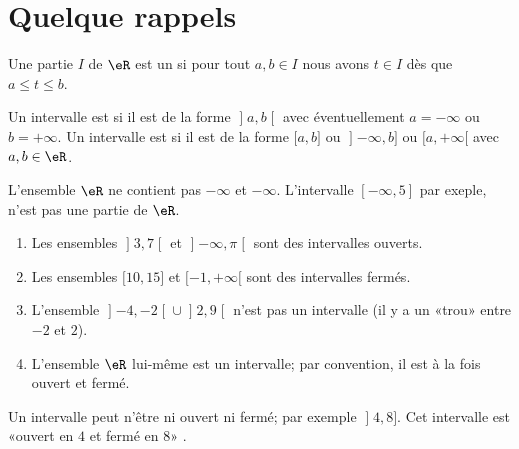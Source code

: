 
\section{Quelque rappels}

\begin{definition}[Intervalle]
    Une partie \( I\) de \( \eR\) est un  si pour tout \( a,b\in I\) nous avons \( t\in I\) dès que \( a\leq t\leq b\).

    Un intervalle est  si il est de la forme \( \mathopen] a , b \mathclose[\) avec éventuellement \( a=-\infty\) ou \( b=+\infty\). Un intervalle est  si il est de la forme \( \mathopen[ a , b \mathclose]\) ou \( \mathopen] -\infty , b \mathclose]\) ou \( \mathopen[ a , +\infty [\) avec \( a,b\in \eR\).
\end{definition}

\begin{remark}
  L'ensemble $\eR$ ne contient pas $-\infty$ et $-\infty$. L'intervalle $[-\infty, 5]$ par exeple, n'est pas une partie de $\eR$.
\end{remark}

\begin{example}
    \begin{enumerate}
        \item
        Les ensembles \( \mathopen] 3 , 7 \mathclose[\) et \( \mathopen] -\infty , \pi \mathclose[\) sont des intervalles ouverts.
        \item
            Les ensembles \( \mathopen[ 10 , 15 \mathclose]\) et \( \mathopen[ -1 , +\infty [\) sont des intervalles fermés.
        \item
        L'ensemble \( \mathopen] -4 , -2 \mathclose[\cup\mathopen] 2 , 9 \mathclose[\) n'est pas un intervalle (il y a un «trou» entre \(- 2\) et \( 2\)).
        \item
            L'ensemble \( \eR\) lui-même est un intervalle; par convention, il est à la fois ouvert et fermé.
    \end{enumerate}
Un intervalle peut n'être ni ouvert ni fermé; par exemple \( \mathopen] 4 , 8 \mathclose]\). Cet intervalle est «ouvert en \( 4\) et fermé en \( 8\)» .
\end{example}

